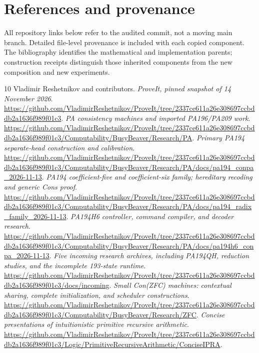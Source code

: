 \documentclass[11pt]{article}
\theoremstyle{definition}\newtheorem{definition}[theorem]{Definition}
\begin{document}
\clearpage
\section*{References and provenance}

All repository links below refer to the audited commit, not a moving main
branch. Detailed file-level provenance is included with each copied
component. The bibliography identifies the mathematical and implementation
parents; construction receipts distinguish those inherited components
from the new composition and new experiments.
\begin{thebibliography}{10}
 Vladimir Reshetnikov and contributors.
\emph{ProveIt, pinned snapshot of 14 November 2026}.
\url{https://github.com/VladimirReshetnikov/ProveIt/tree/2337ce611a26e308697ccbddb2a1636f989f01c3}.
 \emph{PA consistency machines and imported PA196/PA209 work}.
\url{https://github.com/VladimirReshetnikov/ProveIt/tree/2337ce611a26e308697ccbddb2a1636f989f01c3/Computability/BusyBeaver/Research/PA}.
 \emph{Primary PA194 separate-head construction and calibration}.
\url{https://github.com/VladimirReshetnikov/ProveIt/tree/2337ce611a26e308697ccbddb2a1636f989f01c3/Computability/BusyBeaver/Research/PA/docs/pa194_conpa_2026-11-13}.
 \emph{PA194 coefficient-five and coefficient-six family;
hereditary recoding and generic Cons proof}.
\url{https://github.com/VladimirReshetnikov/ProveIt/tree/2337ce611a26e308697ccbddb2a1636f989f01c3/Computability/BusyBeaver/Research/PA/docs/pa194_radix_family_2026-11-13}.
 \emph{PA194H6 controller, command compiler, and decoder research}.
\url{https://github.com/VladimirReshetnikov/ProveIt/tree/2337ce611a26e308697ccbddb2a1636f989f01c3/Computability/BusyBeaver/Research/PA/docs/pa194h6_conpa_2026-11-13}.
 \emph{Five incoming research archives, including PA194QH,
reduction studies, and the incomplete 193-state runtime}.
\url{https://github.com/VladimirReshetnikov/ProveIt/tree/2337ce611a26e308697ccbddb2a1636f989f01c3/docs/incoming}.
 \emph{Small Con(ZFC) machines: contextual sharing, complete
initialization, and scheduler constructions}.
\url{https://github.com/VladimirReshetnikov/ProveIt/tree/2337ce611a26e308697ccbddb2a1636f989f01c3/Computability/BusyBeaver/Research/ZFC}.
 \emph{Concise presentations of intuitionistic primitive recursive arithmetic}.
\url{https://github.com/VladimirReshetnikov/ProveIt/tree/2337ce611a26e308697ccbddb2a1636f989f01c3/Logic/PrimitiveRecursiveArithmetic/ConciseIPRA}.
\end{thebibliography}
\end{document}
